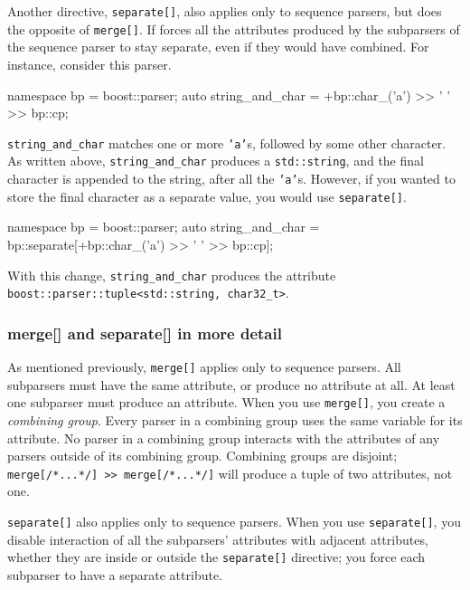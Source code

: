 Another directive, \texttt{separate{[}{]}}, also applies only to sequence parsers, but does the opposite of \texttt{merge{[}{]}}. If forces all the attributes produced by the subparsers of the sequence parser to stay separate, even if they would have combined. For instance, consider this parser.

\begin{code}
namespace bp = boost::parser;
auto string_and_char = +bp::char_('a') >> ' ' >> bp::cp;
\end{code}

\texttt{string\_and\_char} matches one or more \texttt{'a'}s, followed by some other character. As written above, \texttt{string\_and\_char} produces a \texttt{std::string}, and the final character is appended to the string, after all the \texttt{'a'}s. However, if you wanted to store the final character as a separate value, you would use \texttt{separate{[}{]}}.

\begin{code}
namespace bp = boost::parser;
auto string_and_char = bp::separate[+bp::char_('a') >> ' ' >> bp::cp];
\end{code}

With this change, \texttt{string\_and\_char} produces the attribute \texttt{boost::parser::tuple<std::string, char32\_t>}.

\subsubsection{merge{[}{]} and separate{[}{]} in more detail}

As mentioned previously, \texttt{merge{[}{]}} applies only to sequence parsers. All subparsers must have the same attribute, or produce no attribute at all. At least one subparser must produce an attribute. When you use \texttt{merge{[}{]}}, you create a \emph{combining group}. Every parser in a combining group uses the same variable for its attribute. No parser in a combining group interacts with the attributes of any parsers outside of its combining group. Combining groups are disjoint; \texttt{merge{[}/*...*/{]} >> merge{[}/*...*/{]}} will produce a tuple of two attributes, not one.

\texttt{separate{[}{]}} also applies only to sequence parsers. When you use \texttt{separate{[}{]}}, you disable interaction of all the subparsers' attributes with adjacent attributes, whether they are inside or outside the \texttt{separate{[}{]}} directive; you force each subparser to have a separate attribute.


